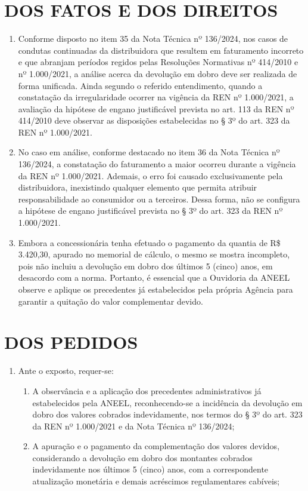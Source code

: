 \newcommand{\tipoRequerimento}{Contestação do memorial de cálculo, pagamento complementar do dobro}

\section{DOS FATOS E DOS DIREITOS}

\begin{enumerate}[resume]
\item Conforme disposto no item 35 da Nota Técnica nº 136/2024, nos casos de condutas continuadas da distribuidora que resultem em faturamento incorreto e que abranjam períodos regidos pelas Resoluções Normativas nº 414/2010 e nº 1.000/2021, a análise acerca da devolução em dobro deve ser realizada de forma unificada. Ainda segundo o referido entendimento, quando a constatação da irregularidade ocorrer na vigência da REN nº 1.000/2021, a avaliação da hipótese de engano justificável prevista no art. 113 da REN nº 414/2010 deve observar as disposições estabelecidas no § 3º do art. 323 da REN nº 1.000/2021.
\item No caso em análise, conforme destacado no item 36 da Nota Técnica nº 136/2024, a constatação do faturamento a maior ocorreu durante a vigência da REN nº 1.000/2021. Ademais, o erro foi causado exclusivamente pela distribuidora, inexistindo qualquer elemento que permita atribuir responsabilidade ao consumidor ou a terceiros. Dessa forma, não se configura a hipótese de engano justificável prevista no § 3º do art. 323 da REN nº 1.000/2021. 
\item Embora a concessionária tenha efetuado o pagamento da quantia de  R\$ 3.420,30, apurado no memorial de cálculo, o mesmo se mostra incompleto, pois não incluiu a devolução em dobro dos últimos 5 (cinco) anos, em desacordo com a norma. Portanto, é essencial que a Ouvidoria da ANEEL observe e aplique os precedentes já estabelecidos pela própria Agência para garantir a quitação do valor complementar devido.
\end{enumerate}

\section{DOS PEDIDOS}

\begin{enumerate}[resume]
\item Ante o exposto, requer-se:
    \begin{enumerate}
    \item A observância e a aplicação dos precedentes administrativos já estabelecidos pela ANEEL, reconhecendo-se a incidência da devolução em dobro dos valores cobrados indevidamente, nos termos do § 3º do art. 323 da REN nº 1.000/2021 e da Nota Técnica nº 136/2024;
    \item A apuração e o pagamento da complementação dos valores devidos, considerando a devolução em dobro dos montantes cobrados indevidamente nos últimos 5 (cinco) anos, com a correspondente atualização monetária e demais acréscimos regulamentares cabíveis;

    \end{enumerate}
\end{enumerate}